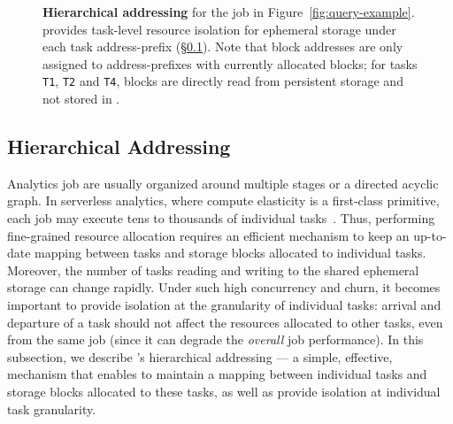 \begin{figure}[t]
\begin{tikzpicture}[font=\scriptsize, yscale=0.75, task/.style={draw, circle, align=center, inner sep=2pt}, block/.style={draw, align=center, fill=gray!20, inner sep=2pt}]
  \end{tikzpicture}
  \caption[Hierarchical addressing]{\textbf{Hierarchical addressing} for the job in Figure~\ref{fig:query-example}. \jiffy provides task-level resource isolation for ephemeral storage under each task address-prefix (\S\ref{ssec:hva}). Note that block addresses are only assigned to address-prefixes with currently allocated blocks; for tasks \texttt{T1}, \texttt{T2} and \texttt{T4}, blocks are directly read from persistent storage and not stored in \jiffy.}
  \label{fig:hina}
\end{figure}

\subsection{Hierarchical Addressing}
\label{ssec:hva}
Analytics job are usually organized around multiple stages or a directed acyclic graph. In serverless analytics, where compute elasticity is a first-class primitive, each job may execute tens to thousands of individual tasks~\cite{starling, locus, pocket, flint, sparkonlambda, cirrus, excamera, pywren, numpywren, gg, athena, aurora, azuresqldw, cloudburst, snowset}. Thus, performing fine-grained resource allocation requires an efficient mechanism to keep an up-to-date mapping between tasks and storage blocks allocated to individual tasks. Moreover, the number of tasks reading and writing to the shared ephemeral storage can change rapidly. Under such high concurrency and churn, it becomes important to provide isolation at the granularity of individual tasks: arrival and departure of a task should not affect the resources allocated to other tasks, even from the same job (since it can degrade the \textit{overall} job performance). In this subsection, we describe \jiffy's hierarchical addressing --- a simple, effective, mechanism that enables \jiffy to maintain a mapping between individual tasks and storage blocks allocated to these tasks, as well as provide isolation at individual task granularity.


